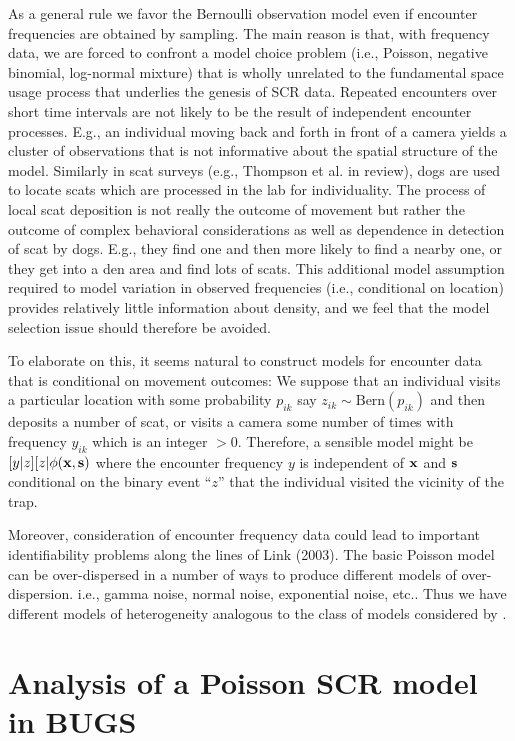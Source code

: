 As a general rule we favor the Bernoulli observation model even if
encounter frequencies are obtained by sampling.  The main reason is
that, with frequency data, we are forced to confront a model choice
problem (i.e., Poisson, negative binomial, log-normal mixture) that is
wholly unrelated to the fundamental space usage process that underlies
the genesis of SCR data. Repeated encounters over short time intervals
are not likely to be the result of independent encounter
processes. E.g., an individual moving back and forth in front of a
camera yields a cluster of observations that is not informative about
the spatial structure of the model. Similarly in scat surveys (e.g.,
Thompson et al. in review), dogs are used to locate scats which are
processed in the lab for individuality.  The process of local scat
deposition is not really the outcome of movement but rather the
outcome of complex behavioral considerations as well as dependence in
detection of scat by dogs. E.g., they find one and then more likely to
find a nearby one, or they get into a den area and find lots of scats.
This additional model assumption required to model variation in
observed frequencies (i.e., conditional on location) provides
relatively little information about density, and we feel that the
model selection issue should therefore be avoided.

To elaborate on this, it seems natural to construct models for
encounter data that is conditional on movement outcomes: We suppose
that an individual visits a particular location with some probability
$p_{ik}$ say $z_{ik}\sim  \mbox{Bern}(p_{ik})$ and then deposits a number of scat,
or visits a camera some number of times with frequency $y_{ik}$ which
is 
an integer $> 0$. Therefore, a sensible model might be
$[y|z][z|\phi({\bf x},{\bf s})$
where the encounter frequency $y$ is independent of ${\bf x}$ and
${\bf s}$ conditional
on the binary event ``$z$'' that the individual visited the vicinity of
the trap.

Moreover, consideration of encounter frequency data could lead to
important identifiability problems along the lines of Link (2003). The
basic Poisson model can be over-dispersed in a number of ways to
produce different models of over-dispersion.  i.e., gamma noise,
normal noise, exponential noise, etc..  Thus we have different models
of heterogeneity analogous to the class of models considered by \citet{link:2003}.


\section{Analysis of a Poisson SCR model in BUGS}

